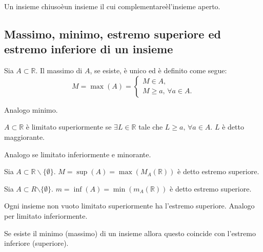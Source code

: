 \begin{definition}
    Un insieme chiusoèun insieme il cui complementareèl'insieme aperto.
\end{definition}

\subsection{Massimo, minimo, estremo superiore ed estremo inferiore di un insieme}
\begin{definition}[Massimo]
    Sia $A\subset\mathbb R$. Il massimo di $A$, se esiste, è unico ed è definito come segue:
    \begin{equation*}
        M=\max(A)=
        \begin{cases}
            M\in A,\\
            M\geq a,\, \forall a\in A.
        \end{cases}
    \end{equation*}
\end{definition}

Analogo minimo.

\begin{definition}
    $A\subset\mathbb R$ è limitato superiormente se $\exists L\in\mathbb R$ tale che $L\geq a,\,\forall a\in A$.
    $L$ è detto maggiorante.
\end{definition}

Analogo se limitato inferiormente e minorante.

\begin{definition}
    Sia $A\subset\mathbb R\backslash\{\emptyset\}$. $M=\sup(A)=\max(M_A(\mathbb{R}))$ è detto estremo superiore.
\end{definition}

\begin{definition}
    Sia $A\subset R\mathbb\backslash\{\emptyset\}$. $m=\inf(A)=\min(m_A(\mathbb{R}))$ è detto estremo superiore.
\end{definition}

\begin{theorem}
    Ogni insieme non vuoto limitato superiormente ha l'estremo superiore. Analogo per limitato inferiormente.
\end{theorem}

\begin{theorem}
    Se esiste il minimo (massimo) di un insieme allora questo coincide con l'estremo inferiore (superiore).
\end{theorem}